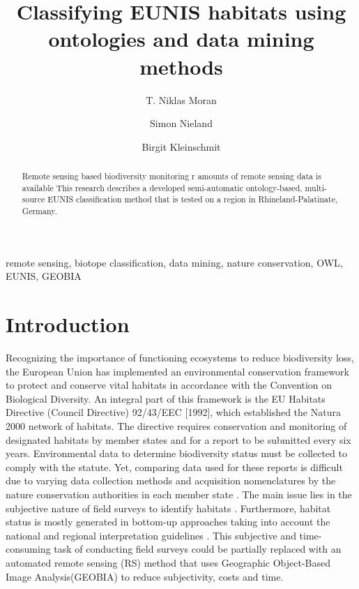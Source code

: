 \documentclass[authoryear, review,12pt,number]{elsarticle}
\begin{document}


%
\lstset{language=XML}

\begin{frontmatter}
\linenumbers
\title{Classifying EUNIS habitats using ontologies and data mining methods}

\author[TUB]{T. Niklas Moran}

\author[TUB]{Simon Nieland}
\author[TUB]{Birgit Kleinschmit}

\address[TUB]{Geoinformation in Environmental Planning Lab, Technische
Universit\"at Berlin, Stra\ss e des 17. Juni 145, 10623 Berlin, Germany}


\begin{abstract}
     Remote sensing based biodiversity monitoring r
amounts of remote sensing data is available 
This research describes a developed semi-automatic ontology-based, multi-source 
EUNIS classification method that is tested on a region in 
Rhineland-Palatinate, Germany. 
\end{abstract}

\begin{keyword}
remote sensing, biotope classification, data mining, nature conservation, OWL, 
EUNIS, GEOBIA
\end{keyword}
\end{frontmatter}
\linenumbers

\section{Introduction}
Recognizing the importance of functioning ecosystems to reduce biodiversity 
loss, the European Union has implemented an environmental conservation 
framework to protect and conserve vital habitats in accordance with the 
Convention on Biological Diversity. An integral part of this framework is the 
EU Habitats Directive (Council Directive) 92/43/EEC [1992], which established 
the Natura 2000 network of habitats. The directive requires conservation and 
monitoring of designated habitats by member states and for a report to be 
submitted every six years. Environmental data to determine biodiversity status 
must be collected to comply with the statute. Yet, comparing data used for 
these reports is difficult due to varying data collection methods and 
acquisition nomenclatures by the nature conservation authorities in each member 
state \citep{VandenBorre2011}. The main issue lies in the subjective nature of 
field surveys to identify habitats \citep{Cherrill1999, Cherrill1999a, 
Hearn_2011, Nieland2015}. Furthermore, habitat status is mostly generated in 
bottom-up approaches taking into account the national and regional 
interpretation guidelines \citep{VandenBorre2011, INSPIREdataspecs}. This 
subjective and time-consuming task of conducting field surveys could be 
partially replaced with an automated remote sensing (RS) method that uses 
Geographic Object-Based Image
Analysis(GEOBIA) to reduce subjectivity, costs and time.
\end{document}
